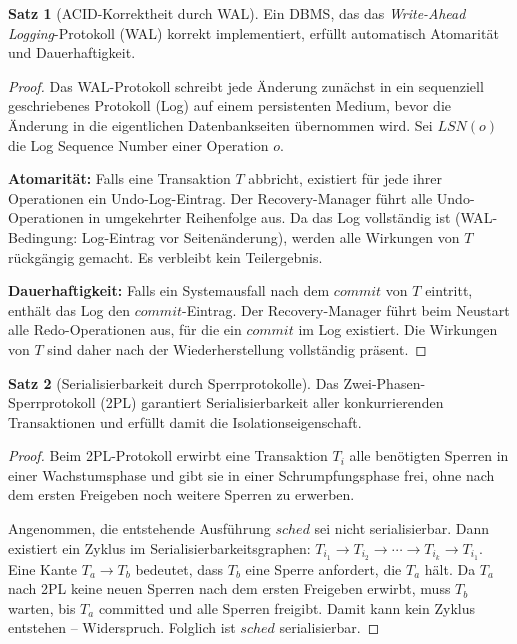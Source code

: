 ﻿\documentclass[a4paper,12pt]{article}
\theoremstyle{definition}
\newtheorem{satz}{Satz}
\begin{document}
\begin{satz}[ACID-Korrektheit durch WAL]
\label{satz:wal}
Ein DBMS, das das \emph{Write-Ahead Logging}-Protokoll (WAL) korrekt implementiert, erfüllt automatisch Atomarität und Dauerhaftigkeit.
\end{satz}

\begin{proof}
Das WAL-Protokoll schreibt jede Änderung zunächst in ein sequenziell geschriebenes Protokoll (Log) auf einem persistenten Medium, bevor die Änderung in die eigentlichen Datenbankseiten übernommen wird. Sei $\mathit{LSN}(o)$ die Log Sequence Number einer Operation $o$.

\textbf{Atomarität:} Falls eine Transaktion $T$ abbricht, existiert für jede ihrer Operationen ein Undo-Log-Eintrag. Der Recovery-Manager führt alle Undo-Operationen in umgekehrter Reihenfolge aus. Da das Log vollständig ist (WAL-Bedingung: Log-Eintrag vor Seitenänderung), werden alle Wirkungen von $T$ rückgängig gemacht. Es verbleibt kein Teilergebnis.

\textbf{Dauerhaftigkeit:} Falls ein Systemausfall nach dem $\mathit{commit}$ von $T$ eintritt, enthält das Log den $\mathit{commit}$-Eintrag. Der Recovery-Manager führt beim Neustart alle Redo-Operationen aus, für die ein $\mathit{commit}$ im Log existiert. Die Wirkungen von $T$ sind daher nach der Wiederherstellung vollständig präsent.
\end{proof}

\begin{satz}[Serialisierbarkeit durch Sperrprotokolle]
\label{satz:serialisierbarkeit}
Das Zwei-Phasen-Sperrprotokoll (2PL) garantiert Serialisierbarkeit aller konkurrierenden Transaktionen und erfüllt damit die Isolationseigenschaft.
\end{satz}

\begin{proof}
Beim 2PL-Protokoll erwirbt eine Transaktion $T_i$ alle benötigten Sperren in einer Wachstumsphase und gibt sie in einer Schrumpfungsphase frei, ohne nach dem ersten Freigeben noch weitere Sperren zu erwerben.

Angenommen, die entstehende Ausführung $\mathit{sched}$ sei nicht serialisierbar. Dann existiert ein Zyklus im Serialisierbarkeitsgraphen: $T_{i_1} \to T_{i_2} \to \cdots \to T_{i_k} \to T_{i_1}$. Eine Kante $T_a \to T_b$ bedeutet, dass $T_b$ eine Sperre anfordert, die $T_a$ hält. Da $T_a$ nach 2PL keine neuen Sperren nach dem ersten Freigeben erwirbt, muss $T_b$ warten, bis $T_a$ committed und alle Sperren freigibt. Damit kann kein Zyklus entstehen -- Widerspruch. Folglich ist $\mathit{sched}$ serialisierbar.
\end{proof}
\end{document}

